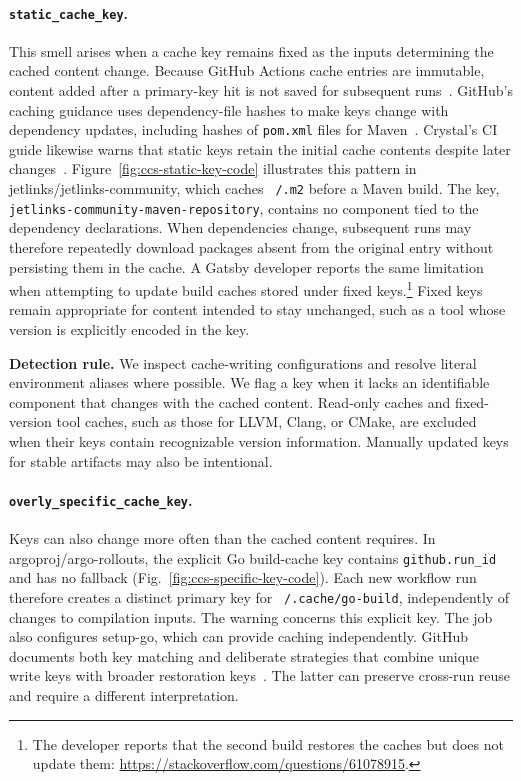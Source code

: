 \documentclass[smallextended]{svjour3}
\begin{document}
\paragraph{\texttt{static\_cache\_key}.}
This smell arises when a cache key remains fixed as the inputs determining the cached content change. Because GitHub Actions cache entries are immutable, content added after a primary-key hit is not saved for subsequent runs~\citep{gha_cache_docs}. GitHub's caching guidance uses dependency-file hashes to make keys change with dependency updates, including hashes of \texttt{pom.xml} files for Maven~\citep{gha_cache_strategies,gha_cache_maven_example}. Crystal's CI guide likewise warns that static keys retain the initial cache contents despite later changes~\citep{crystal_ci_caching}. Figure~\ref{fig:ccs-static-key-code} illustrates this pattern in jetlinks/jetlinks-community, which caches \texttt{\string~/.m2} before a Maven build. The key, \texttt{jetlinks-community-maven-repository}, contains no component tied to the dependency declarations. When dependencies change, subsequent runs may therefore repeatedly download packages absent from the original entry without persisting them in the cache. A Gatsby developer reports the same limitation when attempting to update build caches stored under fixed keys.\footnote{The developer reports that the second build restores the caches but does not update them: \url{https://stackoverflow.com/questions/61078915}.} Fixed keys remain appropriate for content intended to stay unchanged, such as a tool whose version is explicitly encoded in the key.



\textbf{Detection rule.}
We inspect cache-writing configurations and resolve literal environment aliases where possible. We flag a key when it lacks an identifiable component that changes with the cached content. Read-only caches and fixed-version tool caches, such as those for LLVM, Clang, or CMake, are excluded when their keys contain recognizable version information. Manually updated keys for stable artifacts may also be intentional.



\paragraph{\texttt{overly\_specific\_cache\_key}.}
Keys can also change more often than the cached content requires. In argoproj/argo-rollouts, the explicit Go build-cache key contains \texttt{github.run\_id} and has no fallback (Fig.~\ref{fig:ccs-specific-key-code}). Each new workflow run therefore creates a distinct primary key for \texttt{\string~/.cache/go-build}, independently of changes to compilation inputs. The warning concerns this explicit key. The job also configures setup-go, which can provide caching independently. GitHub documents both key matching and deliberate strategies that combine unique write keys with broader restoration keys~\citep{gha_cache_action,gha_cache_tips}. The latter can preserve cross-run reuse and require a different interpretation.
\end{document}

